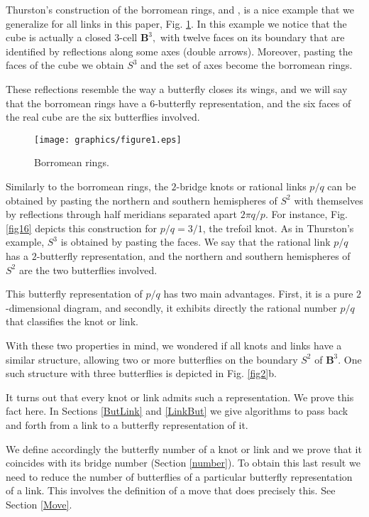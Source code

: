 \documentclass{amsproc}\usepackage{eurosym}
\theoremstyle{plain}
\numberwithin{equation}{section}
\begin{document}
Thurston's construction of the borromean rings, \cite{Th1} and \cite{Th2}, is a nice
example that we generalize for all links in this paper, Fig. \ref{borro}. In
this example we notice that the cube is actually a closed $3$-cell
$\mathbf{B}^{3},$ with twelve faces on its boundary that are identified by
reflections along some axes (double arrows). Moreover, pasting the faces of
the cube we obtain $S^{3}$ and the set of axes become the borromean rings.

These reflections resemble the way a butterfly closes its wings, and we will
say that the borromean rings have a $6$-butterfly representation, and the six
faces of the real cube are the six butterflies involved.

\begin{figure}
[h]
\begin{center}
\texttt{[image: graphics/figure1.eps]}\caption{Borromean rings.}
\label{borro}
\end{center}
\end{figure}

Similarly to the borromean rings, the $2$-bridge knots or rational links $p/q$
can be obtained by pasting the northern and southern hemispheres of $S^{2}$
with themselves by reflections through half meridians separated apart $2\pi
q/p.$ For instance, Fig. \ref{fig16} depicts this construction for $p/q=3/1$,
the trefoil knot. As in Thurston's example, $S^{3}$ is obtained by pasting the faces. We say that the rational
link $p/q$ has a $2$-butterfly representation, and the northern and southern
hemispheres of $S^{2}$ are the two butterflies involved.

This butterfly representation of $p/q$ has two main advantages. First, it is a
pure $2$-dimensional diagram, and secondly, it exhibits directly the rational
number $p/q$ that classifies the knot or link.

With these two properties in mind, we wondered if all knots and links have a
similar structure, allowing two or more butterflies on the boundary $S^{2}$ of
$\mathbf{B}^{3}.$ One such structure with three butterflies is depicted in
Fig. \ref{fig2}b.

It turns out that every knot or link admits such a representation. We prove
this fact here. In Sections \ref{ButLink} and \ref{LinkBut} we give algorithms
to pass back and forth from a link to a butterfly representation of it.

We define accordingly the butterfly number of a knot or link and we prove that
it coincides with its bridge number (Section \ref{number}). To obtain this
last result we need to reduce the number of butterflies of a particular
butterfly representation of a link. This involves the definition of a move
that does precisely this. See Section \ref{Move}.
\end{document}
